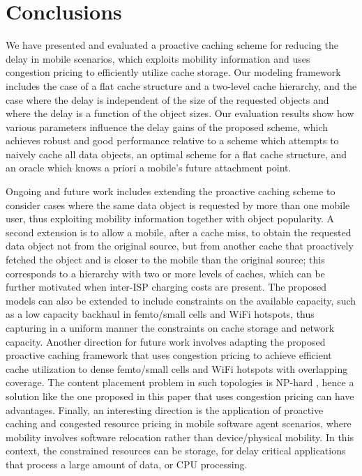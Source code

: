 \documentclass[conference]{IEEEtran}
\newcommand{\mynote}[1]{{{\medskip
\footnotesize \em \noindent Note: #1}}\medskip}
\renewcommand{\mynote}[1]{}
\begin{document}
\mynote{
\begin{itemize}
\item need to check/verify this explanation.
\end{itemize}
}




\vspace{-0.09in}
\section{Conclusions}
\label{sec:conclusions}
\vspace{-0.03in}

We have presented and evaluated a proactive caching scheme for reducing the delay in mobile scenarios, which exploits mobility information and uses congestion pricing  to efficiently utilize cache storage. Our modeling framework includes the case of a  flat cache structure and a two-level cache hierarchy, and  the case where the delay is independent of the size of the requested objects and  where the delay is a function of the object sizes. Our evaluation results
show how various parameters influence the delay gains of the proposed  scheme, which achieves robust and good performance relative to a scheme which attempts to naively cache all data objects,  an optimal scheme for a flat cache structure, and an oracle which knows a priori a mobile's future  attachment point.

Ongoing and future work includes extending the proactive caching scheme to consider cases where the same data object is requested by more than one mobile user, thus exploiting mobility information together with  object popularity.
A second extension  is to allow a mobile, after a cache miss, to obtain the requested data object not from the original source, but from another cache that proactively fetched the object and is closer to the mobile than the original source; this corresponds to a hierarchy with two or more levels of caches, which can be further motivated when inter-ISP charging costs are present.
The proposed models can also be extended to include constraints on the available capacity, such as  a low capacity backhaul in femto/small cells  and WiFi hotspots, thus capturing in a uniform manner the constraints on cache storage and network capacity.
Another direction for future work involves adapting the proposed proactive caching framework that uses congestion pricing to achieve efficient cache utilization to  dense femto/small cells and WiFi hotspots with overlapping coverage. The content placement problem in such topologies is NP-hard \cite{Gol++12}, hence a solution like the one proposed in this paper that uses congestion pricing can have advantages.
Finally, an interesting direction is the application of proactive caching and congested resource pricing in mobile software agent scenarios, where mobility involves software relocation rather than device/physical mobility. In this context, the constrained resources can be storage, for delay critical applications that process a large amount of data, or CPU processing.
\end{document}
